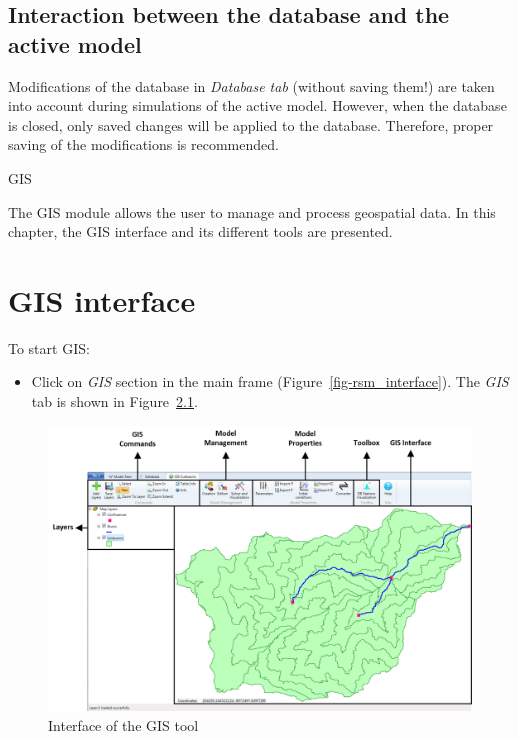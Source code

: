 \documentclass[
  letterpaper,
  DIV=11,
  numbers=noendperiod]{scrreprt}
\providecommand{\tightlist}{%
  \setlength{\itemsep}{0pt}\setlength{\parskip}{0pt}}\usepackage{longtable,booktabs,array}
\begin{document}
\hypertarget{interaction-between-the-database-and-the-active-model}{%
\section{Interaction between the database and the active
model}\label{interaction-between-the-database-and-the-active-model}}

Modifications of the database in \emph{Database tab} (without saving
them!) are taken into account during simulations of the active model.
However, when the database is closed, only saved changes will be applied
to the database. Therefore, proper saving of the modifications is
recommended.

GIS

The GIS module allows the user to manage and process geospatial data. In
this chapter, the GIS interface and its different tools are presented.

\hypertarget{gis-interface}{%
\chapter{GIS interface}\label{gis-interface}}

To start GIS:

\begin{itemize}
\tightlist
\item
  {Click on \emph{GIS} section in the main frame
  (Figure~\ref{fig-rsm_interface}).} The \emph{GIS} tab is shown in
  Figure~\ref{fig-gis_tool_interface}.
\end{itemize}

\begin{figure}

{\centering \includegraphics{./figures/fig-gis_tool_interface.png}

}

\caption{\label{fig-gis_tool_interface}Interface of the GIS tool}

\end{figure}
\end{document}
